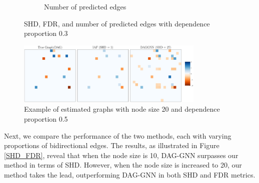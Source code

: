 \documentclass[10pt]{article}
\begin{document}
\begin{figure}[H]
\begin{subfigure}{0.45\textwidth}
        \caption{Number of predicted edges}
        \label{pred_edge_prop30}
    \end{subfigure}
    \caption{SHD, FDR, and number of predicted edges with dependence proportion 0.3}
    \label{SHD_FDR_prop30}
\end{figure}

\begin{figure}[H]
    \centering
    \includegraphics[width=0.8\textwidth]{fig/comparison_dep_20_50_seed31.pdf}
    \caption{Example of estimated graphs with node size 20 and dependence proportion 0.5}
    \label{example_graphs}
\end{figure}

Next, we compare the performance of the two methods, each with varying proportions of bidirectional edges. The results, as illustrated in Figure \ref*{SHD_FDR}, reveal that when the node size is 10, DAG-GNN surpasses our method in terms of SHD. However, when the node size is increased to 20, our method takes the lead, outperforming DAG-GNN in both SHD and FDR metrics.\\
\end{document}
